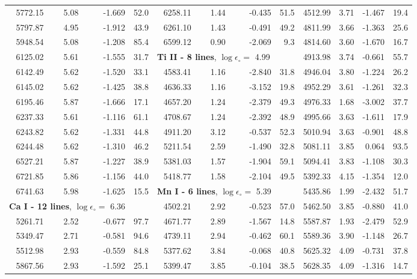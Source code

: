 \documentclass[oldversion]{aa}
\begin{document}
\begin{table}[!t]
\begin{tabular}{c c r r | c c r r | c c r r}
5772.15 & 5.08 & -1.669 &  52.0 & 6258.11 & 1.44 & -0.435 &  51.5 & 4512.99 & 3.71 & -1.467 &  19.4\\
5797.87 & 4.95 & -1.912 &  43.9 & 6261.10 & 1.43 & -0.491 &  49.2 & 4811.99 & 3.66 & -1.363 &  25.6\\
5948.54 & 5.08 & -1.208 &  85.4 & 6599.12 & 0.90 & -2.069 &   9.3 & 4814.60 & 3.60 & -1.670 &  16.7\\
6125.02 & 5.61 & -1.555 &  31.7 & \multicolumn{3}{l}{\textbf{Ti II - 8 lines}, $\log\epsilon_\circ=$ 4.99} & & 4913.98 & 3.74 & -0.661 &  55.7\\
6142.49 & 5.62 & -1.520 &  33.1 & 4583.41 & 1.16 & -2.840 &  31.8 & 4946.04 & 3.80 & -1.224 &  26.2\\
6145.02 & 5.62 & -1.425 &  38.8 & 4636.33 & 1.16 & -3.152 &  19.8 & 4952.29 & 3.61 & -1.261 &  32.3\\
6195.46 & 5.87 & -1.666 &  17.1 & 4657.20 & 1.24 & -2.379 &  49.3 & 4976.33 & 1.68 & -3.002 &  37.7\\
6237.33 & 5.61 & -1.116 &  61.1 & 4708.67 & 1.24 & -2.392 &  48.9 & 4995.66 & 3.63 & -1.611 &  17.9\\
6243.82 & 5.62 & -1.331 &  44.8 & 4911.20 & 3.12 & -0.537 &  52.3 & 5010.94 & 3.63 & -0.901 &  48.8\\
6244.48 & 5.62 & -1.310 &  46.2 & 5211.54 & 2.59 & -1.490 &  32.8 & 5081.11 & 3.85 &  0.064 &  93.5\\
6527.21 & 5.87 & -1.227 &  38.9 & 5381.03 & 1.57 & -1.904 &  59.1 & 5094.41 & 3.83 & -1.108 &  30.3\\
6721.85 & 5.86 & -1.156 &  44.0 & 5418.77 & 1.58 & -2.104 &  49.5 & 5392.33 & 4.15 & -1.354 &  12.0\\
6741.63 & 5.98 & -1.625 &  15.5 & \multicolumn{3}{l}{\textbf{Mn I - 6 lines}, $\log\epsilon_\circ=$ 5.39} & & 5435.86 & 1.99 & -2.432 &  51.7\\
\multicolumn{3}{l}{\textbf{Ca I - 12 lines}, $\log\epsilon_\circ=$ 6.36} & & 4502.21 & 2.92 & -0.523 &  57.0 & 5462.50 & 3.85 & -0.880 &  41.0\\
5261.71 & 2.52 & -0.677 &  97.7 & 4671.77 & 2.89 & -1.567 &  14.8 & 5587.87 & 1.93 & -2.479 &  52.9\\
5349.47 & 2.71 & -0.581 &  94.6 & 4739.11 & 2.94 & -0.462 &  60.1 & 5589.36 & 3.90 & -1.148 &  26.7\\
5512.98 & 2.93 & -0.559 &  84.8 & 5377.62 & 3.84 & -0.068 &  40.8 & 5625.32 & 4.09 & -0.731 &  37.8\\
5867.56 & 2.93 & -1.592 &  25.1 & 5399.47 & 3.85 & -0.104 &  38.5 & 5628.35 & 4.09 & -1.316 &  14.7\\

\end{tabular}
\end{table}
\end{document}
